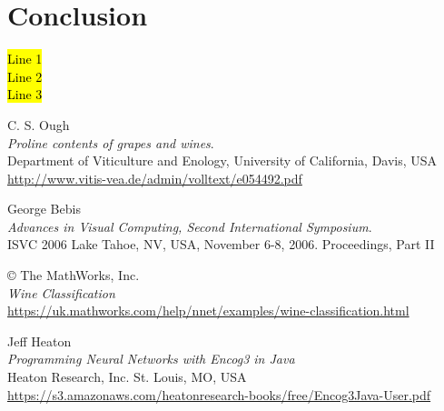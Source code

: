 \documentclass[10pt,twocolumn,letterpaper]{article}
\begin{document}
\section{Conclusion}
\hl{Line 1\\

Line 2\\

Line 3\\}
\begin{thebibliography}{9}
C. S. Ough\\
\textit{Proline contents of grapes and wines}. \\
Department of Viticulture and Enology, University of California, Davis, USA\\
\url{http://www.vitis-vea.de/admin/volltext/e054492.pdf}

George Bebis\\
\textit{Advances in Visual Computing, Second International Symposium}.\\
ISVC 2006 Lake Tahoe, NV, USA, November 6-8, 2006. Proceedings, Part II 

© The MathWorks, Inc.\\
\textit{Wine Classification}\\
\url{https://uk.mathworks.com/help/nnet/examples/wine-classification.html}

Jeff Heaton\\
\textit{Programming Neural Networks with Encog3 in Java}\\
Heaton Research, Inc. St. Louis, MO, USA\\
\url{https://s3.amazonaws.com/heatonresearch-books/free/Encog3Java-User.pdf}

\end{thebibliography}
\end{document}
